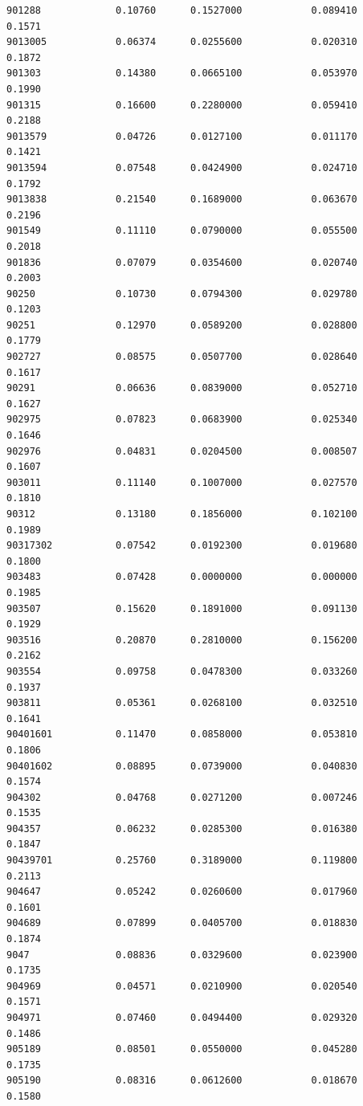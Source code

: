 \documentclass[
  letterpaper,
  DIV=11,
  numbers=noendperiod]{scrartcl}
\begin{document}
\begin{verbatim}
901288             0.10760      0.1527000            0.089410        0.1571
9013005            0.06374      0.0255600            0.020310        0.1872
901303             0.14380      0.0665100            0.053970        0.1990
901315             0.16600      0.2280000            0.059410        0.2188
9013579            0.04726      0.0127100            0.011170        0.1421
9013594            0.07548      0.0424900            0.024710        0.1792
9013838            0.21540      0.1689000            0.063670        0.2196
901549             0.11110      0.0790000            0.055500        0.2018
901836             0.07079      0.0354600            0.020740        0.2003
90250              0.10730      0.0794300            0.029780        0.1203
90251              0.12970      0.0589200            0.028800        0.1779
902727             0.08575      0.0507700            0.028640        0.1617
90291              0.06636      0.0839000            0.052710        0.1627
902975             0.07823      0.0683900            0.025340        0.1646
902976             0.04831      0.0204500            0.008507        0.1607
903011             0.11140      0.1007000            0.027570        0.1810
90312              0.13180      0.1856000            0.102100        0.1989
90317302           0.07542      0.0192300            0.019680        0.1800
903483             0.07428      0.0000000            0.000000        0.1985
903507             0.15620      0.1891000            0.091130        0.1929
903516             0.20870      0.2810000            0.156200        0.2162
903554             0.09758      0.0478300            0.033260        0.1937
903811             0.05361      0.0268100            0.032510        0.1641
90401601           0.11470      0.0858000            0.053810        0.1806
90401602           0.08895      0.0739000            0.040830        0.1574
904302             0.04768      0.0271200            0.007246        0.1535
904357             0.06232      0.0285300            0.016380        0.1847
90439701           0.25760      0.3189000            0.119800        0.2113
904647             0.05242      0.0260600            0.017960        0.1601
904689             0.07899      0.0405700            0.018830        0.1874
9047               0.08836      0.0329600            0.023900        0.1735
904969             0.04571      0.0210900            0.020540        0.1571
904971             0.07460      0.0494400            0.029320        0.1486
905189             0.08501      0.0550000            0.045280        0.1735
905190             0.08316      0.0612600            0.018670        0.1580

\end{verbatim}
\end{document}
